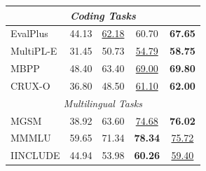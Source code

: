\documentclass[dvipsnames]{article}
\begin{document}
\begin{table}[tbp]
\begin{tabular}{@{}lcccc@{}}
\midrule
\multicolumn{5}{c}{\textit{Coding Tasks}} \\
\midrule
EvalPlus & 44.13 & \underline{62.18} & 60.70 & \textbf{67.65} \\
MultiPL-E & 31.45 & 50.73 & \underline{54.79} & \textbf{58.75}  \\
MBPP & 48.40 & 63.40 & \underline{69.00} & \textbf{69.80} \\
CRUX-O & 36.80 & 48.50 & \underline{61.10} & \textbf{62.00}  \\
\midrule
\multicolumn{5}{c}{\textit{Multilingual Tasks}} \\
\midrule
MGSM & 38.92 & 63.60 & \underline{74.68} & \textbf{76.02}  \\
MMMLU & 59.65 & 71.34 & \textbf{78.34} & \underline{75.72} \\
IINCLUDE & 44.94 & 53.98 & \textbf{60.26} & \underline{59.40} \\
\bottomrule
\end{tabular}
\end{table}
\end{document}
